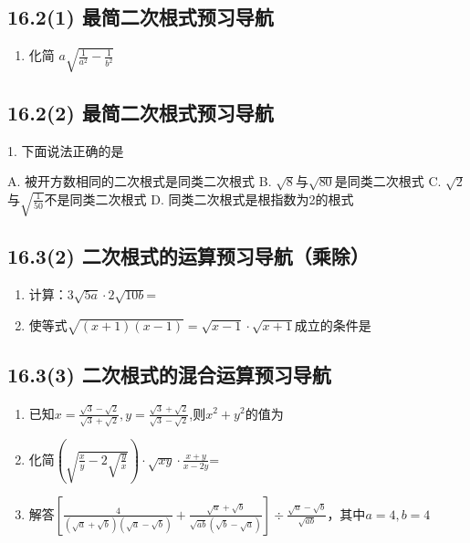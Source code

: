 \documentclass[UTF8]{ctexart}
\begin{document}
\subsection{16.2(1) 最简二次根式预习导航}

\begin{enumerate}
    
\item 化简 $a\sqrt{\frac{1}{a^2}-\frac{1}{b^2}}$

\end{enumerate}

\subsection{16.2(2) 最简二次根式预习导航}

1. 下面说法正确的是

    A. 被开方数相同的二次根式是同类二次根式
    B. $\sqrt{8}$与$\sqrt{80}$是同类二次根式
    C. $\sqrt{2}$与$\sqrt{\frac{1}{50}}$不是同类二次根式
    D. 同类二次根式是根指数为2的根式
    
\subsection{16.3(2) 二次根式的运算预习导航（乘除）}

\begin{enumerate}
\item 计算：$3 \sqrt{5a} \cdot 2 \sqrt{10b}$=\underline{\quad\quad\quad\quad}
\item 使等式$\sqrt{(x+1)(x-1)}=\sqrt{x-1} \cdot \sqrt{x+1}$成立的条件是\underline{\quad\quad\quad}
\end{enumerate}
\subsection{16.3(3) 二次根式的混合运算预习导航}

\begin{enumerate}

\item 已知$x=\frac{\sqrt{3}-\sqrt{2}}{\sqrt{3}+\sqrt{2}},y=\frac{\sqrt{3}+\sqrt{2}}{\sqrt{3}-\sqrt{2}}$,则$x^2+y^2$的值为\underline{\quad\quad}

\item 化简$(\sqrt{\frac{x}{y}-2\sqrt{\frac{y}{x}}}) \cdot \sqrt{xy} \cdot \frac{x+y}{x-2y}$=\underline{\quad\quad\quad\quad}

\item 解答$[\frac{4}{(\sqrt{a}+\sqrt{b})(\sqrt{a}-\sqrt{b})} + \frac{\sqrt{a}+\sqrt{b}}{\sqrt{ab}(\sqrt{b}-\sqrt{a})}] \div \frac{\sqrt{a}-\sqrt{b}}{\sqrt{ab}}$，其中$a=4,b=4$

\end{enumerate}   
\end{document}
